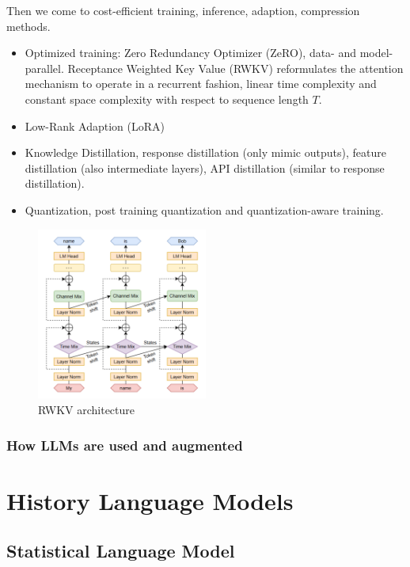 \documentclass[10pt]{elegantbook}
\begin{document}
\vspace{\baselineskip}

Then we come to cost-efficient training, inference, adaption, compression methods.
\begin{itemize}
    \item Optimized training: Zero Redundancy Optimizer (ZeRO), data- and model-parallel. Receptance Weighted Key Value (RWKV) reformulates the attention 
mechanism to operate in a recurrent fashion, linear time complexity and constant space complexity with respect to sequence length $T$.
    \item Low-Rank Adaption (LoRA)
    \item Knowledge Distillation, response distillation (only mimic outputs), feature distillation (also intermediate layers), API distillation (similar to
response distillation).
    \item Quantization, post training quantization and quantization-aware training.
\end{itemize}

\begin{figure}[htbp]
    \centering
    \includegraphics[width=0.50\textwidth]{image/rwkv.png}
    \caption{RWKV architecture}
    \label{fig:rwkv}
\end{figure}

\subsection{How LLMs are used and augmented}

\chapter{History Language Models}

\section{Statistical Language Model}
\end{document}
